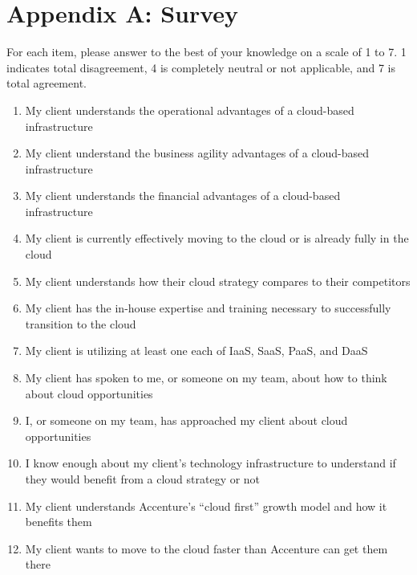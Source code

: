 \section{Appendix A: Survey}

For each item, please answer to the best of your knowledge on a scale of 1 to 7. 1 indicates total disagreement, 4 is completely neutral or not applicable, and 7 is total agreement.

\begin{enumerate}
  \item{My client understands the operational advantages of a cloud-based infrastructure}
  \item{My client understand the business agility advantages of a cloud-based infrastructure}
  \item{My client understands the financial advantages of a cloud-based infrastructure}
  \item{My client is currently effectively moving to the cloud or is already fully in the cloud}
  \item{My client understands how their cloud strategy compares to their competitors}
  \item{My client has the in-house expertise and training necessary to successfully transition to the cloud}
  \item{My client is utilizing at least one each of IaaS, SaaS, PaaS, and DaaS}
  \item{My client has spoken to me, or someone on my team, about how to think about cloud opportunities}
  \item{I, or someone on my team, has approached my client about cloud opportunities}
  \item{I know enough about my client's technology infrastructure to understand if they would benefit from a cloud strategy or not}
  \item{My client understands Accenture's ``cloud first'' growth model and how it benefits them}
  \item{My client wants to move to the cloud faster than Accenture can get them there}




\end{enumerate}
